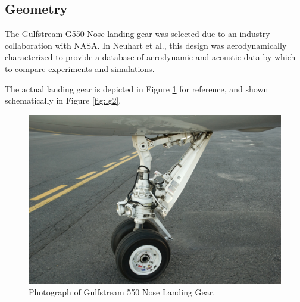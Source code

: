 \subsection{Geometry}

The Gulfstream G550 Nose landing gear was selected due to an industry collaboration with NASA. In Neuhart et al., this design was aerodynamically characterized to provide a database of aerodynamic and acoustic data by which to compare experiments and simulations. 

The actual landing gear is depicted in Figure \ref{fig:lg1} for reference, and shown schematically in Figure \ref{fig:lg2}.



\begin{figure}
	\begin{center}
		\centerline{\includegraphics[scale=0.4]{figures/g550_nlg.pdf}}
		\caption{Photograph of Gulfstream 550 Nose Landing Gear.}
		\label{fig:lg1}
	\end{center}
\end{figure}

